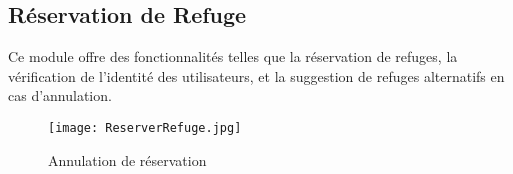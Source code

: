 \subsection{Réservation de Refuge}



Ce module offre des fonctionnalités telles que la réservation de refuges, la vérification de l'identité des utilisateurs, et la suggestion de refuges alternatifs en cas d'annulation.



\begin{figure}[H]
    \centering
    \texttt{[image: ReserverRefuge.jpg]}\\[1cm] 
    \caption{Annulation de réservation}
    \label{fig:enter-label}
\end{figure}



